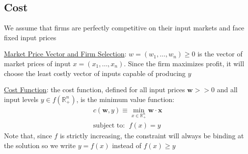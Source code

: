\documentclass{article}
\begin{document}
\subsection{Cost}
We assume that firms are perfectly competitive on their input markets and face fixed input prices \par \vspace{0.3em}
  \underline{Market Price Vector and Firm Selection}: $w = (w_{1}, \dots, w_{n}) \geq 0$ is the vector of market prices of input $x = (x_{1}, \dots, x_{n})$. Since the firm maximizes profit, it will choose the least costly vector of inputs capable of producing $y$
  \par
  \underline{Cost Function}: the cost function, defined for all input prices $\mathbf{w} >> 0$ and all input levels $y \in f(\mathbb{R}_{+}^{n})$, is the minimum value function:
  \begin{gather*}
    c(\mathbf{w},y) \equiv \min_{x \in \mathbb{R}_{+}^{n}} \mathbf{w} \cdot \mathbf{x} \\
    \text{subject to}: \ \ f(x) = y
  \end{gather*}
  Note that, since $f$ is strictly increasing, the constraint will always be binding at the solution so we write $y = f(x)$ instead of $f(x) \geq y$
\end{document}
